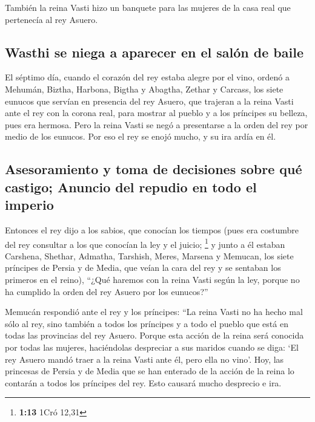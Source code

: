 \begin{paracol}{2}
 También la reina Vasti hizo un banquete para las mujeres
de la casa real que pertenecía al rey Asuero.

\hypertarget{wasthi-se-niega-a-aparecer-en-el-saluxf3n-de-baile}{%
\subsection{Wasthi se niega a aparecer en el salón de
baile}\label{wasthi-se-niega-a-aparecer-en-el-saluxf3n-de-baile}}

 El séptimo día, cuando el corazón del rey estaba alegre
por el vino, ordenó a Mehumán, Biztha, Harbona, Bigtha y Abagtha, Zethar
y Carcass, los siete eunucos que servían en presencia del rey Asuero,
 que trajeran a la reina Vasti ante el rey con la corona
real, para mostrar al pueblo y a los príncipes su belleza, pues era
hermosa.  Pero la reina Vasti se negó a presentarse a la
orden del rey por medio de los eunucos. Por eso el rey se enojó mucho, y
su ira ardía en él.

\hypertarget{asesoramiento-y-toma-de-decisiones-sobre-quuxe9-castigo-anuncio-del-repudio-en-todo-el-imperio}{%
\subsection{Asesoramiento y toma de decisiones sobre qué castigo;
Anuncio del repudio en todo el
imperio}\label{asesoramiento-y-toma-de-decisiones-sobre-quuxe9-castigo-anuncio-del-repudio-en-todo-el-imperio}}

 Entonces el rey dijo a los sabios, que conocían los
tiempos (pues era costumbre del rey consultar a los que conocían la ley
y el juicio; \footnote{\textbf{1:13} 1Cró 12,31}  y junto
a él estaban Carshena, Shethar, Admatha, Tarshish, Meres, Marsena y
Memucan, los siete príncipes de Persia y de Media, que veían la cara del
rey y se sentaban los primeros en el reino),  ``¿Qué
haremos con la reina Vasti según la ley, porque no ha cumplido la orden
del rey Asuero por los eunucos?''

 Memucán respondió ante el rey y los príncipes: ``La
reina Vasti no ha hecho mal sólo al rey, sino también a todos los
príncipes y a todo el pueblo que está en todas las provincias del rey
Asuero.  Porque esta acción de la reina será conocida por
todas las mujeres, haciéndolas despreciar a sus maridos cuando se diga:
`El rey Asuero mandó traer a la reina Vasti ante él, pero ella no vino'.
 Hoy, las princesas de Persia y de Media que se han
enterado de la acción de la reina lo contarán a todos los príncipes del
rey. Esto causará mucho desprecio e ira.


\end{paracol}

